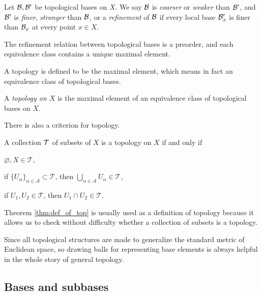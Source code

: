 \begin{defn}
Let $\mathcal{B},\mathcal{B}'$ be topological bases on $X$.
We say $\mathcal{B}$ is \emph{coarser} or \emph{weaker} than $\mathcal{B}'$, and $\mathcal{B}'$ is \emph{finer}, \emph{stronger} than $\mathcal{B}$, or a \emph{refinement} of $\mathcal{B}$ if every local base $\mathcal{B}'_x$ is finer than $\mathcal{B}_x$ at every point $x\in X$.
\end{defn}
\begin{prop}
The refinement relation between topological bases is a preorder, and each equivalence class contains a unique maximal element.
\end{prop}
\begin{pf}
\end{pf}

A topology is defined to be the maximal element, which means in fact an equivalence class of topological bases.

\begin{defn}
A \emph{topology on $X$} is the maximal element of an equivalence class of topological bases on $X$.
\end{defn}

There is also a criterion for topology.

\begin{thm}\label{thm:def_of_top}
A collection $\mathcal{T}$ of subsets of $X$ is a topology on $X$ if and only if
\begin{cond}
\item $\varnothing,X\in\mathcal{T}$,
\item if $\{U_\alpha\}_{\alpha\in\mathcal{A}}\subset\mathcal{T}$, then $\bigcup_{\alpha\in\mathcal{A}}U_\alpha\in\mathcal{T}$,
\item if $U_1,U_2\in\mathcal{T}$, then $U_1\cap U_2\in\mathcal{T}$.
\end{cond}
\end{thm}
\begin{pf}
\end{pf}
Theorem \ref{thm:def_of_top} is usually used as a definition of topology because it allows us to check without difficulty whether a collection of subsets is a topology.


Since all topological structures are made to generalize the standard metric of Euclidean space, so drawing balls for representing base elements is always helpful in the whole story of general topology.






\subsection{Bases and subbases}

